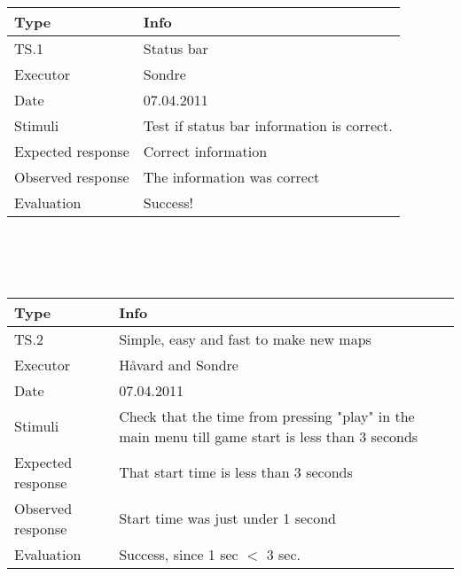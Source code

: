   \\
  \\
  \\
  \begin{tabular}{|l | p{8.7cm} |}
	\hline	
	\textbf{Type} & \textbf{Info} \\
	\hline
	TS.1 & Status bar \\
	\hline
	Executor & Sondre \\
	\hline
	Date & 07.04.2011 \\
	\hline
	Stimuli & Test if status bar information is correct. \\
	\hline
	Expected response & Correct information\\
	\hline
	Observed response & The information was correct\\
	\hline
	Evaluation & Success! \\
	\hline
  \end{tabular}
  \\
  \\
  \\
  \begin{tabular}{|l | p{8.7cm} |}
	\hline	
	\textbf{Type} & \textbf{Info} \\
	\hline
	TS.2 & Simple, easy and fast to make new maps \\
	\hline
	Executor & Håvard and Sondre \\
	\hline
	Date & 07.04.2011 \\
	\hline
	Stimuli & Check that the time from pressing "play" in the main menu till game start is less than 3 seconds \\
	\hline
	Expected response & That start time is less than 3 seconds\\
	\hline
	Observed response & Start time was just under 1 second\\
	\hline
	Evaluation & Success, since 1 sec $<$ 3 sec. \\
	\hline
  \end{tabular}
  \\
  \\
  \\
  

